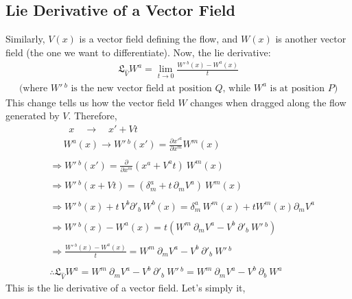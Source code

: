 \documentclass[14pt]{article} %
\begin{document}
\subsection{Lie Derivative of a Vector Field}
Similarly, $V(x)$ is a vector field defining the flow, and $W(x)$ is another vector field (the one we want to differentiate). Now, the lie derivative:
\begin{align*}
\mathfrak{L}_{\hat{V}} W^a = \lim_{t \to 0} \frac{W'\,^b(x) - W^a(x)}{t}
\end{align*}
\begin{align*}
\text{(where $W'\,^b$ is the new vector field at position $Q$, while $W^a$ is at position $P$)}
\end{align*}
This change tells us how the vector field $W$ changes when dragged along the flow generated by $V$. Therefore,
\begin{align*}
& \quad \quad x \quad \rightarrow \quad x' + Vt \\
& \quad ~~W^a(x) \rightarrow W'\,^b(x') = \frac{\partial x'^a}{\partial x^m} W^m(x) \\\\
& \Rightarrow W'\,^b(x') = \frac{\partial}{\partial x^m}(x^a + V^a t)~W^m(x) \\\\
& \Rightarrow W'\,^b(x + Vt) = \left( \delta^a_m + t\,\partial_m V^a \right)~W^m(x) \\\\
& \Rightarrow W'\,^b(x)+ t\,V^b \partial'_b\,W^b(x) = \delta^a_m\,W^m(x) + t W^m(x) \partial_m V^a \\\\
& \Rightarrow W'\,^b(x) - W^a(x) = t \left(W^m~\partial_m V^a - V^b~ \partial'_b ~W'\,^b \right) \\\\
& \Rightarrow \frac{W'\,^b(x) - W^a(x)}{t} = W^m~\partial_m V^a - V^b~ \partial'_b ~W'\,^b \\\\
&  \boxed{\therefore \mathfrak{L}_{\hat{V}} W^a = W^m~\partial_m V^a - V^b~ \partial'_b ~W'\,^b = W^m~\partial_m V^a - V^b~ \partial_b ~W^a}
\end{align*}
This is the lie derivative of a vector field. Let's simply it,
\end{document}

